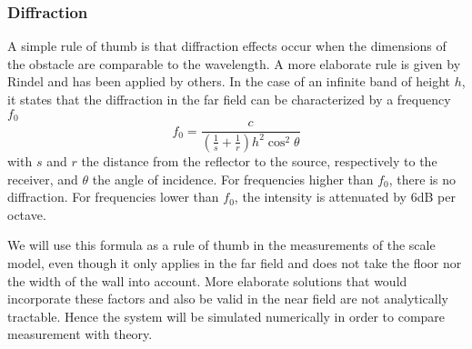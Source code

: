 \subsubsection{Diffraction}

A simple rule of thumb is that diffraction effects occur when the dimensions of the obstacle are comparable to the wavelength. A more elaborate rule is given by Rindel\cite{rindel-diffraction} and has been applied by others\cite{davy-diffraction, stage-acoustics}. In the case of an infinite band of height $h$, it states that the diffraction in the far field can be characterized by a frequency $f_0$
\begin{equation}
\label{diffractionEq}
f_0 = \frac{c}{
	\left(\frac{1}{s} + \frac{1}{r}\right) h^2 \cos^2 \theta}
\end{equation}
with $s$ and $r$ the distance from the reflector to the source, respectively to the receiver, and $\theta$ the angle of incidence. For frequencies higher than $f_0$, there is no diffraction. For frequencies lower than $f_0$, the intensity is attenuated by 6dB per octave. 

We will use this formula as a rule of thumb in the measurements of the scale model, even though it only applies in the far field and does not take the floor nor the width of the wall into account. More elaborate solutions that would incorporate these factors and also be valid in the near field are not analytically tractable. Hence the system will be simulated numerically in order to compare measurement with theory.






\begin{comment}

\end{comment}
